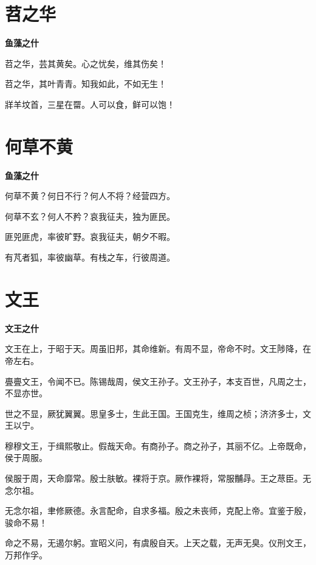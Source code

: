 \documentclass[12pt,a4paper]{ctexbook}
\begin{document}
\section{苕之华}
\textbf{鱼藻之什}\par\vspace{0.5em}
苕之华，芸其黄矣。心之忧矣，维其伤矣！\par
苕之华，其叶青青。知我如此，不如无生！\par
牂羊坟首，三星在罶。人可以食，鲜可以饱！\par

\section{何草不黄}
\textbf{鱼藻之什}\par\vspace{0.5em}
何草不黄？何日不行？何人不将？经营四方。\par
何草不玄？何人不矜？哀我征夫，独为匪民。\par
匪兕匪虎，率彼旷野。哀我征夫，朝夕不暇。\par
有芃者狐，率彼幽草。有栈之车，行彼周道。\par

\section{文王}
\textbf{文王之什}\par\vspace{0.5em}
文王在上，于昭于天。周虽旧邦，其命维新。有周不显，帝命不时。文王陟降，在帝左右。\par
亹亹文王，令闻不已。陈锡哉周，侯文王孙子。文王孙子，本支百世，凡周之士，不显亦世。\par
世之不显，厥犹翼翼。思皇多士，生此王国。王国克生，维周之桢；济济多士，文王以宁。\par
穆穆文王，于缉熙敬止。假哉天命。有商孙子。商之孙子，其丽不亿。上帝既命，侯于周服。\par
侯服于周，天命靡常。殷士肤敏。裸将于京。厥作裸将，常服黼冔。王之荩臣。无念尔祖。\par
无念尔祖，聿修厥德。永言配命，自求多福。殷之未丧师，克配上帝。宜鉴于殷，骏命不易！\par
命之不易，无遏尔躬。宣昭义问，有虞殷自天。上天之载，无声无臭。仪刑文王，万邦作孚。\par
\end{document}
